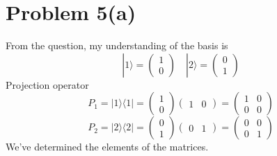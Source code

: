 \documentclass[letter]{article}
\begin{document}
\section*{Problem 5(a)}
From the question, my understanding of the basis is 
\[
| 1 \rangle = \begin{pmatrix} 1 \\ 0 \end{pmatrix} \quad 
| 2 \rangle = \begin{pmatrix} 0 \\ 1 \end{pmatrix} 
\] 
Projection operator 
\[
P_1 = | 1 \rangle \langle 1 |  = 
\begin{pmatrix} 1 \\ 0 \end{pmatrix} 
\begin{pmatrix} 1 & 0 \end{pmatrix} 
=
\begin{pmatrix} 1 & 0 \\ 0 & 0 \end{pmatrix} 
\]
\[
P_2 = | 2 \rangle \langle 2 | 
= 
\begin{pmatrix} 0 \\ 1 \end{pmatrix}
\begin{pmatrix} 0 & 1  \end{pmatrix}
= 
\begin{pmatrix} 0 & 0 \\ 0 & 1 \end{pmatrix} 
\] 
We've determined the elements of the matrices.
\end{document}
